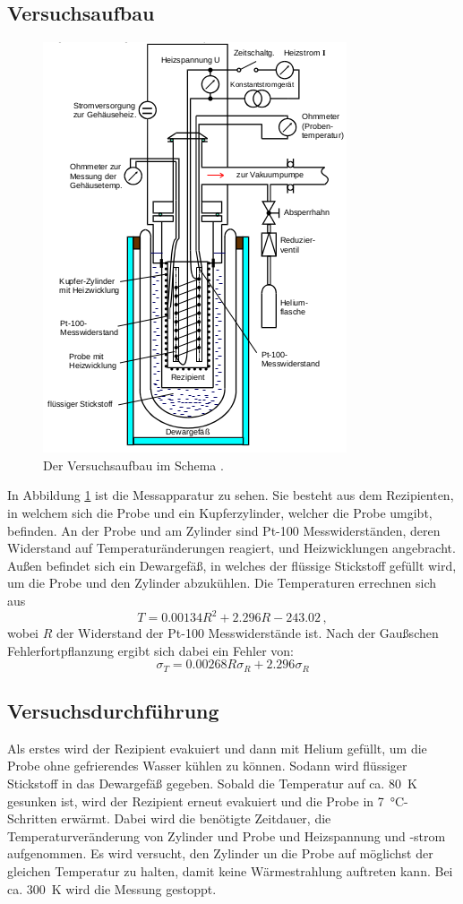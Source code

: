 \subsection{Versuchsaufbau}
\begin{figure}
  \centering
  \includegraphics[scale=0.5]{aufbau.png}
  \caption{Der Versuchsaufbau im Schema \cite{anleitung}.}
  \label{fig:1}
\end{figure}
In Abbildung \ref{fig:1} ist die Messapparatur zu sehen. Sie besteht aus dem Rezipienten,
in welchem sich die Probe und ein Kupferzylinder, welcher die Probe umgibt, befinden.
An der Probe und am Zylinder sind Pt-100 Messwiderständen,
deren Widerstand auf Temperaturänderungen reagiert, und Heizwicklungen angebracht.
Außen befindet sich ein Dewargefäß,
in welches der flüssige Stickstoff gefüllt wird, um die Probe und den Zylinder abzukühlen.
Die Temperaturen errechnen sich aus
\begin{equation}
  T = 0.00134 R^2 + 2.296 R - 243.02 \, ,
  \label{widerstand}
\end{equation}
wobei $R$ der Widerstand der Pt-100 Messwiderstände ist. Nach der Gaußschen
Fehlerfortpflanzung ergibt sich dabei ein Fehler von:
\begin{equation}
  \sigma_T = 0.00268 R \sigma_R + 2.296 \sigma_R
\end{equation}

\subsection{Versuchsdurchführung}
Als erstes wird der Rezipient evakuiert und dann mit Helium gefüllt, um die Probe
ohne gefrierendes Wasser kühlen zu können. Sodann wird flüssiger Stickstoff in das
Dewargefäß gegeben. Sobald die Temperatur auf ca. \SI{80}{\kelvin} gesunken ist,
wird der Rezipient erneut evakuiert und die Probe in \SI{7}{\celsius}-
Schritten erwärmt. Dabei wird die benötigte Zeitdauer, die Temperaturveränderung
von Zylinder und Probe und Heizspannung und -strom aufgenommen. Es wird versucht,
den Zylinder un die Probe auf möglichst der gleichen Temperatur zu halten, damit
keine Wärmestrahlung auftreten kann. Bei ca. \SI{300}{\kelvin}
wird die Messung gestoppt.
